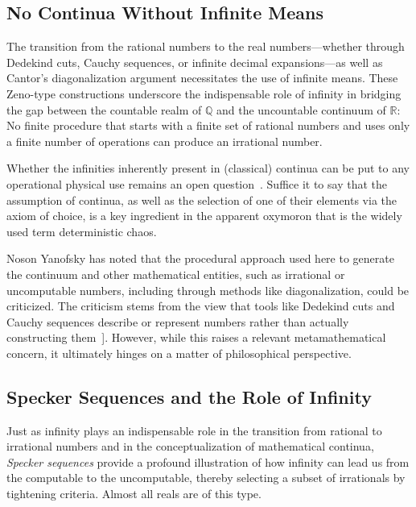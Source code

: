 \documentclass[shortAfour,sageh,times]{sagej}
\begin{document}
\subsection{No Continua Without Infinite Means}

The transition from the rational numbers to the real numbers---whether through Dedekind cuts, Cauchy sequences, or infinite decimal expansions---as well as Cantor's diagonalization argument necessitates the use of infinite means.
These Zeno-type
constructions underscore the indispensable role of infinity in bridging the gap between the countable realm of \(\mathbb{Q}\) and the uncountable continuum of \(\mathbb{R}\):
No finite procedure that starts with a finite set of rational numbers and uses only a finite number of operations can produce an irrational number.


Whether the infinities inherently present in (classical) continua can be put to any operational physical use remains an open question~\citep{svozil-set}.
Suffice it to say that the assumption of continua, as well as the selection of one of their elements via the axiom of choice, is a key ingredient in the apparent oxymoron that is the widely used term deterministic chaos.


Noson Yanofsky has noted that the procedural approach used here to generate the continuum and other mathematical entities, such as irrational or uncomputable numbers, including through methods like diagonalization, could be criticized.
The criticism stems from the view that tools like Dedekind cuts and Cauchy sequences describe or represent numbers rather than actually constructing them~\citep{Yanofsky2025-02-06-pc}].
However, while this raises a relevant metamathematical concern, it ultimately hinges on a matter of philosophical perspective.






\subsection{Specker Sequences and the Role of Infinity}


Just as infinity plays an indispensable role in the transition from rational to irrational numbers and in the conceptualization of mathematical continua,
\textit{Specker sequences} provide a profound illustration of how infinity can lead us from the computable to the uncomputable,  thereby selecting a subset of irrationals by tightening criteria.
Almost all reals are of this type.
\end{document}
